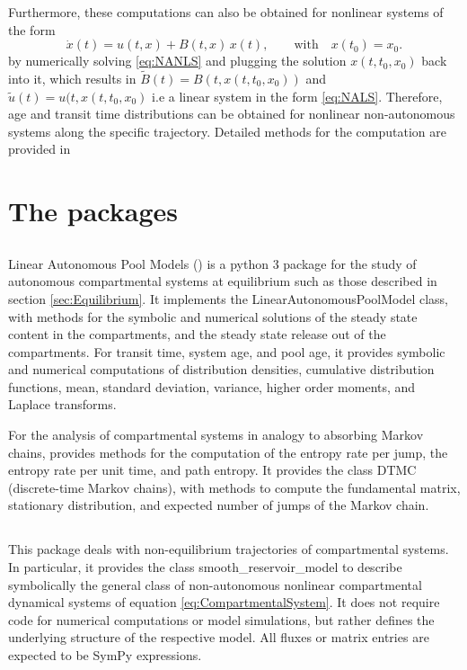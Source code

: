 Furthermore, these computations can also be obtained for nonlinear systems of the form
\begin{equation} \label{eq:NANLS}
\dot{x}(t) = u(t, x) + B(t, x) \, x(t), \qquad  \mathrm{with} \quad x(t_0) = x_0.
\end{equation}
by numerically solving \eqref{eq:NANLS} and plugging the solution $x(t, t_0,
x_0)$ back into it, which results in $\tilde{B}(t)=B(t,x(t, t_0,x_0))$ and
$\tilde{u}(t)=u(t,x(t, t_0,x_0)$  i.e a linear system in the form
\eqref{eq:NALS}. 
Therefore,  age and transit time
distributions can be obtained for nonlinear non-autonomous systems along the
specific trajectory. Detailed methods for the computation are provided in
\citet{Metzler2018PNAS}

\section{The \python packages}
\subsection{\LAPM}
Linear Autonomous Pool Models (\LAPM) is a python 3 package for the study of autonomous compartmental systems at equilibrium such as those described in section \ref{sec:Equilibrium}. 
It implements the LinearAutonomousPoolModel class, with methods for the
symbolic and numerical solutions of the steady state content in the compartments, and the steady state release out of the compartments. For transit time, system age, and pool age, it provides symbolic and numerical computations of distribution densities, cumulative distribution functions, mean, standard deviation,           variance, higher order moments, and Laplace transforms. 

For the analysis of compartmental systems in analogy to absorbing Markov chains, \LAPM provides methods for the computation of the entropy rate per jump, the entropy rate per unit time, and path entropy. It provides the class DTMC (discrete-time Markov chains), with methods to compute the fundamental matrix, stationary distribution, and expected number of jumps of the Markov chain.

\subsection{\CompartmentalSystems}
This package deals with non-equilibrium trajectories of compartmental systems.
In particular, it provides the class smooth\_reservoir\_model to describe
symbolically the general class of non-autonomous nonlinear compartmental
dynamical systems of equation \eqref{eq:CompartmentalSystem}. It does not
require code for numerical computations or model simulations, but rather defines the underlying structure of the respective model. 
All fluxes or matrix entries are expected to be SymPy expressions. 

